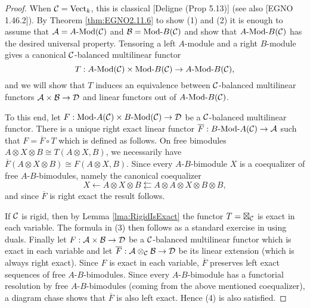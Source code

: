 \documentclass{amsart}
\begin{document}
\begin{proof}
	When $\mathcal C = \mathrm{Vect}_k$, this is classical [Deligne (Prop 5.13)] (see also [EGNO 1.46.2]).
	By Theorem \ref{thm:EGNO2.11.6} to show (1) and (2) it is enough to assume that $\cA = \Mod{A}{}(\cC)$ and $\cB = \Mod{}{B}(\cC)$ and show that $\Mod{A }{B}(\cC)$ has the desired universal property. Tensoring a left $A$-module and a right $B$-module gives a canonical $\mathcal C$-balanced multilinear functor 
		\begin{equation*}
			T: \Mod{A}{}(\cC) \times \Mod{}{B}(\cC) \to \Mod{A}{B}(\cC),  
		\end{equation*}
and we will show that $T$ induces an equivalence between $\mathcal C$-balanced multilinear functors $\mathcal A \times \mathcal B \to \mathcal D$ and linear functors out of $\Mod{A}{B}(\cC)$.
	
	To this end, let $F:\Mod{}{A}(\cC) \times \Mod{B}{}(\cC) \to \cD$ be a $\mathcal C$-balanced multilinear functor.  
	There is a unique right exact linear functor $\overline F: \Mod{B}{A}(\cC) \to \cA$ such that $F = \overline{F} \circ T$ which is defined as follows. On free bimodules $A \otimes X \otimes B \cong T(A \otimes X, B)$, we necessarily have $\overline{F}(A \otimes X \otimes B) \cong F(A \otimes X, B)$. Since  every $A$-$B$-bimodule $X$ is a coequalizer of free $A$-$B$-bimodules, namely the canonical coequalizer  
	\begin{equation*}
		X \leftarrow A \otimes X \otimes B \leftleftarrows A \otimes A \otimes X \otimes B \otimes B,
	\end{equation*}
	and since $\overline{F}$ is right exact the result follows.
	
	If $\mathcal C$ is rigid, then by Lemma \ref{lma:RigidIsExact} the functor $T = \boxtimes_{\mathcal C}$ is exact in each variable. The formula in (3) then follows as a standard exercise in using duals. Finally let $F: \mathcal A \times \mathcal B \to \mathcal D$ be a $\mathcal C$-balanced multilinear functor which is exact in each variable and let $\overline{F}: \mathcal A \otimes_\mathcal C \mathcal B \to \mathcal D$ be its linear extension (which is always right exact). Since $F$ is exact in each variable, $\overline{F}$ preserves left exact sequences of free $A$-$B$-bimodules. Since every $A$-$B$-bimodule has a functorial resolution by free $A$-$B$-bimodules (coming from the above mentioned coequalizer), a diagram chase shows that $\overline{F}$ is also left exact. Hence (4) is also satisfied. 
\end{proof}
\end{document}
